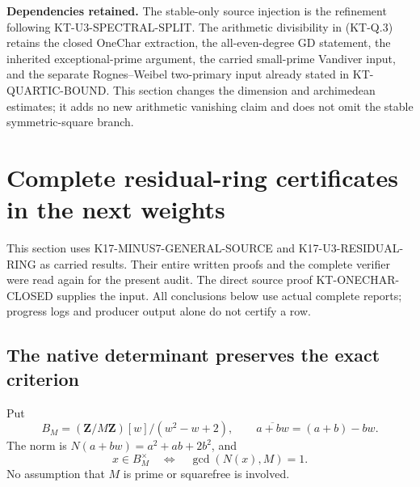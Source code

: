 \documentclass[11pt,a4paper]{article}
\theoremstyle{definition}
\renewcommand{\paragraph}[1]{\par\smallskip\noindent\textbf{#1}\quad\ignorespaces}
\begin{document}
\paragraph{Dependencies retained.}
The stable-only source injection is the refinement following
KT-U3-SPECTRAL-SPLIT.  The arithmetic divisibility in
(KT-Q.3) retains the closed OneChar extraction, the all-even-degree
GD statement, the inherited exceptional-prime argument, the
carried small-prime Vandiver input, and the separate
Rognes--Weibel two-primary input already stated in
KT-QUARTIC-BOUND.  This section changes the dimension and
archimedean estimates; it adds no new arithmetic vanishing
claim and does not omit the stable symmetric-square branch.



\section{Complete residual-ring certificates in the next weights}
\label{sec:kt-higher4}

This section uses K17-MINUS7-GENERAL-SOURCE and
K17-U3-RESIDUAL-RING as carried results.  Their entire written
proofs and the complete verifier were read again for the present
audit.  The direct source proof KT-ONECHAR-CLOSED supplies the
 input.  All conclusions below use actual complete
reports; progress logs and producer output alone do not certify a row.

\subsection{The native determinant preserves the exact criterion}

Put
\[
 B_M=(\mathbf Z/M\mathbf Z)[w]/(w^2-w+2),\qquad
 \overline{a+bw}=(a+b)-bw.
\]
The norm is $N(a+bw)=a^2+ab+2b^2$, and
\[
 x\in B_M^\times\quad\Longleftrightarrow\quad
                  \gcd(N(x),M)=1.                 \tag{KT-H.1}
\]
No assumption that $M$ is prime or squarefree is involved.
\end{document}
